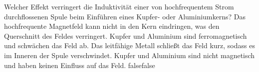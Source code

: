     {Welcher Effekt verringert die Induktivität einer von hochfrequentem Strom durchflossenen Spule beim Einführen eines Kupfer- oder Aluminiumkerns?}
    {Das hochfrequente Magnetfeld kann nicht in den Kern eindringen, was den Querschnitt des Feldes verringert.}
    {Kupfer und Aluminium sind ferromagnetisch und schwächen das Feld ab.}
    {Das leitfähige Metall schließt das Feld kurz, sodass es im Inneren der Spule verschwindet.}
    {Kupfer und Aluminium sind nicht magnetisch und haben keinen Einfluss auf das Feld.}
    {false}{false}